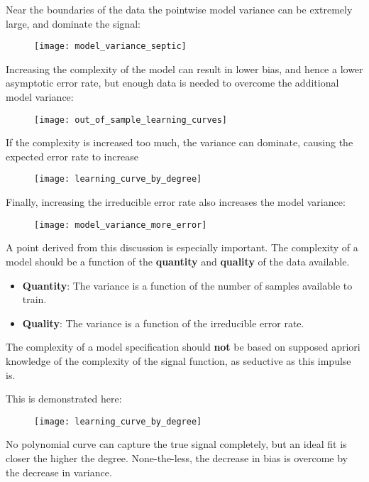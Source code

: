 %
%
\begin{frame}
  Near the boundaries of the data the pointwise model variance can be extremely
  large, and dominate the signal:
  \begin{figure}
    \texttt{[image: model\_variance\_septic]}
  \end{figure}
\end{frame}
%
%
\begin{frame}
  Increasing the complexity of the model can result in lower bias, and hence a
  lower asymptotic error rate, but enough data is needed to overcome the
  additional model variance:
  \begin{figure}
    \texttt{[image: out\_of\_sample\_learning\_curves]}
  \end{figure}
\end{frame}
%
%
\begin{frame}
  If the complexity is increased too much, the variance can dominate, causing
  the expected error rate to increase
  \begin{figure}
    \texttt{[image: learning\_curve\_by\_degree]}
  \end{figure}
\end{frame}
%
%
\begin{frame}
  Finally, increasing the irreducible error rate also increases the model variance:
  \begin{figure}
    \texttt{[image: model\_variance\_more\_error]}
  \end{figure}
\end{frame}
%
%
\begin{frame}
  A point derived from this discussion is especially important.  The complexity
  of a model should be a function of the \textbf{quantity} and \textbf{quality}
  of the data available.
  \begin{itemize}
    \item \textbf{Quantity}: The variance is a function of the number of samples
    available to train.
    \item \textbf{Quality}: The variance is a function of the irreducible error rate.
  \end{itemize}
\end{frame}
%
\begin{frame}
  The complexity of a model specification should \textbf{not} be based on
  supposed apriori knowledge of the complexity of the signal function, as
  seductive as this impulse is.
\end{frame}
%
%
\begin{frame}
  This is demonstrated here:
  \begin{figure}
    \texttt{[image: learning\_curve\_by\_degree]}
  \end{figure}
  No polynomial curve can capture the true signal completely, but an ideal fit
  is closer the higher the degree.  None-the-less, the decrease in bias is
  overcome by the decrease in variance.
\end{frame}

